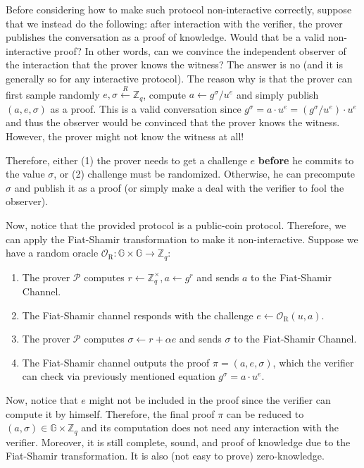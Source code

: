 \documentclass[../lecture-notes.tex]{subfiles}
\begin{document}
\vspace{10px}

\begin{remark}
    Before considering how to make such protocol non-interactive correctly, suppose that we instead do the following: after interaction with the verifier, the prover publishes the conversation as a proof of knowledge. Would that be a valid non-interactive proof? In other words, can we convince the independent observer of the interaction that the prover knows the witness? The answer is no (and it is generally so for any interactive protocol). The reason why is that the prover can first sample randomly $e,\sigma \xleftarrow{R} \mathbb{Z}_q$, compute $a \gets g^{\sigma}/u^e$ and simply publish $(a,e,\sigma)$ as a proof. This is a valid conversation since $g^{\sigma} = a \cdot u^{e} = (g^{\sigma}/u^e) \cdot u^e$ and thus the observer would be convinced that the prover knows the witness. However, the prover might not know the witness at all!

    Therefore, either (1) the prover needs to get a challenge $e$ \textbf{before} he commits to the value $\sigma$, or (2) challenge must be randomized. Otherwise, he can precompute $\sigma$ and publish it as a proof (or simply make a deal with the verifier to fool the observer). 
\end{remark}

Now, notice that the provided protocol is a public-coin protocol. Therefore, we can apply the Fiat-Shamir transformation to make it non-interactive. Suppose we have a random oracle $\mathcal{O}_{\text{R}}: \mathbb{G} \times \mathbb{G} \to \mathbb{Z}_q$:
\begin{enumerate}
    \item The prover $\mathcal{P}$ computes $r \gets \mathbb{Z}_q^{\times}, a \gets g^{r}$ and sends $a$ to the Fiat-Shamir Channel.
    \item The Fiat-Shamir channel responds with the challenge $e \gets \mathcal{O}_{\text{R}}(u,a)$.
    \item The prover $\mathcal{P}$ computes $\sigma \gets r + \alpha e$ and sends $\sigma$ to the Fiat-Shamir Channel.
    \item The Fiat-Shamir channel outputs the proof $\pi = (a,e,\sigma)$, which the verifier can check via previously mentioned equation $g^{\sigma} = a \cdot u^e$.
\end{enumerate}

Now, notice that $e$ might not be included in the proof since the verifier can compute it by himself. Therefore, the final proof $\pi$ can be reduced to $(a,\sigma) \in \mathbb{G} \times \mathbb{Z}_q$ and its computation does not need any interaction with the verifier. Moreover, it is still complete, sound, and proof of knowledge due to the Fiat-Shamir transformation. It is also (not easy to prove) zero-knowledge.
\end{document}
